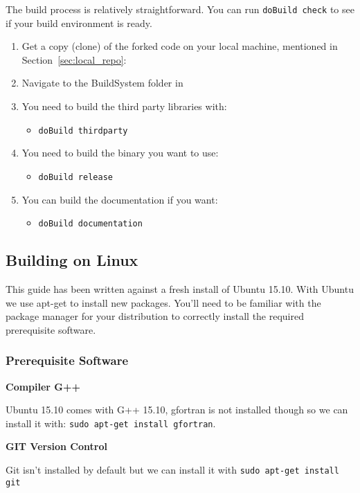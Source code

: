 The build process is relatively straightforward. You can run \texttt{doBuild check} to see if your build environment is ready.

\begin{enumerate}
  \item Get a copy (clone) of the forked code on your local machine, mentioned in Section~\ref{sec:local_repo}: 
  \item Navigate to the BuildSystem folder in 
  \item You need to build the third party libraries with:
  \begin{itemize}
    \item \texttt{doBuild thirdparty}
  \end{itemize}
  \item You need to build the binary you want to use:
  \begin{itemize}
    \item \texttt{doBuild release}
  \end{itemize}	
  \item You can build the documentation if you want:
  \begin{itemize}
    \item \texttt{doBuild documentation}
  \end{itemize}		
\end{enumerate}

\subsection{Building on Linux}

This guide has been written against a fresh install of Ubuntu 15.10. With Ubuntu we use apt-get to install new packages. You’ll need to be familiar with the package manager for your distribution to correctly install the required prerequisite software.

\subsubsection{Prerequisite Software}

\textbf{Compiler G++}

Ubuntu 15.10 comes with G++ 15.10, gfortran is not installed though so we can install it with: \texttt{sudo apt-get install gfortran}.

\textbf{GIT Version Control}

Git isn't installed by default but we can install it with \texttt{sudo apt-get install git}

